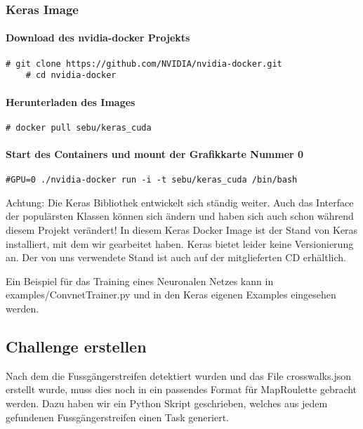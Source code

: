 \subsubsection{Keras Image}
\paragraph{Download des nvidia-docker Projekts}
\begin{lstlisting}[style=BashInputStyle]
	# git clone https://github.com/NVIDIA/nvidia-docker.git
	# cd nvidia-docker
\end{lstlisting}

\paragraph{Herunterladen des Images}
\begin{lstlisting}[style=BashInputStyle]
	# docker pull sebu/keras_cuda
\end{lstlisting}	

\paragraph{Start des Containers und mount der Grafikkarte Nummer 0}
\begin{lstlisting}[style=BashInputStyle]
	#GPU=0 ./nvidia-docker run -i -t sebu/keras_cuda /bin/bash
\end{lstlisting}

Achtung: Die Keras Bibliothek entwickelt sich ständig weiter. Auch das Interface der populärsten Klassen können sich ändern und haben sich auch schon während diesem Projekt verändert! In diesem Keras Docker Image ist der Stand von Keras installiert, mit dem wir gearbeitet haben. Keras bietet leider keine Versionierung an. Der von uns verwendete Stand ist auch auf der mitglieferten CD erhältlich.

Ein Beispiel für das Training eines Neuronalen Netzes kann in examples/ConvnetTrainer.py und in den Keras eigenen Examples eingesehen werden.
\newpage
\subsection{Challenge erstellen}
Nach dem die Fussgängerstreifen detektiert wurden und das File crosswalks.json erstellt wurde, muss dies noch in ein passendes Format für MapRoulette gebracht werden. Dazu haben wir ein Python Skript geschrieben, welches aus jedem gefundenen Fussgängerstreifen einen Task generiert.

